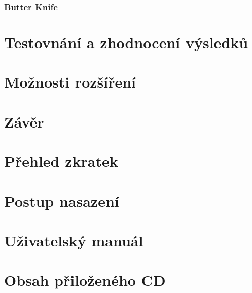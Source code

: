 \documentclass[czech,BP]{thesiskiv}
\begin{document}
		\subsection{Butter Knife}

\chapter{Testovnání a zhodnocení výsledků}	

\chapter{Možnosti rozšíření}

\chapter{Závěr}


\chapter*{Přehled zkratek}



{\raggedright\small

}

\chapter*{Postup nasazení}

\chapter*{Uživatelský manuál}

\chapter*{Obsah přiloženého CD}
\end{document}
